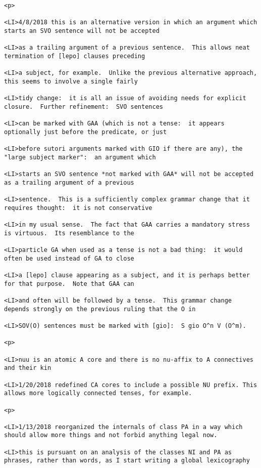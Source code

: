 \documentclass[12pt]{article}
\begin{document}
\begin{lstlisting}
<p>

<LI>4/8/2018 this is an alternative version in which an argument which starts an SVO sentence will not be accepted

<LI>as a trailing argument of a previous sentence.  This allows neat termination of [lepo] clauses preceding

<LI>a subject, for example.  Unlike the previous alternative approach, this seems to involve a single fairly

<LI>tidy change:  it is all an issue of avoiding needs for explicit closure.  Further refinement:  SVO sentences

<LI>can be marked with GAA (which is not a tense:  it appears optionally just before the predicate, or just

<LI>before sutori arguments marked with GIO if there are any), the "large subject marker":  an argument which

<LI>starts an SVO sentence *not marked with GAA* will not be accepted as a trailing argument of a previous

<LI>sentence.  This is a sufficiently complex grammar change that it requires thought:  it is not conservative

<LI>in my usual sense.  The fact that GAA carries a mandatory stress is virtuous.  Its resemblance to the

<LI>particle GA when used as a tense is not a bad thing:  it would often be used instead of GA to close

<LI>a [lepo] clause appearing as a subject, and it is perhaps better for that purpose.  Note that GAA can

<LI>and often will be followed by a tense.  This grammar change depends strongly on the previous ruling that the O in

<LI>SOV(O) sentences must be marked with [gio]:  S gio O^n V (O^m).

<p>

<LI>nuu is an atomic A core and there is no nu-affix to A connectives and their kin

<LI>1/20/2018 redefined CA cores to include a possible NU prefix. This allows more logically connected tenses, for example.

<p>

<LI>1/13/2018 reorganized the internals of class PA in a way which should allow more things and not forbid anything legal now.

<LI>this is pursuant on an analysis of the classes NI and PA as phrases, rather than words, as I start writing a global lexicography


\end{lstlisting}
\end{document}
